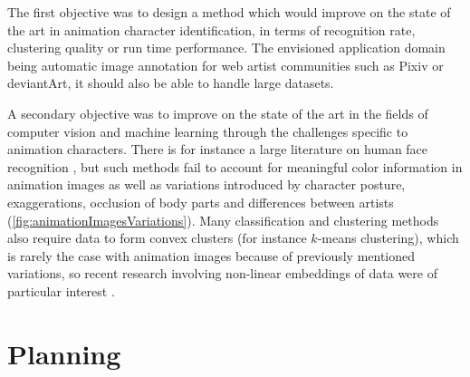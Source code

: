 The first objective was to design a method which would improve on the state of the art in animation character identification, in terms of recognition rate, clustering quality or run time performance. The envisioned application domain being automatic image annotation for web artist communities such as Pixiv\footnotemark[1]
 or deviantArt\footnotemark[2],
it should also be able to handle large datasets.

A secondary objective was to improve on the state of the art in the fields of computer vision and machine learning through the challenges specific to animation characters. There is for instance a large literature on human face recognition \cite{turk1991eigenfaces} \cite{belhumeur1997eigenfaces}, but such methods fail to account for meaningful color information in animation images as well as variations introduced by character posture, exaggerations, occlusion of body parts and differences between artists (\autoref{fig:animationImagesVariations}). Many classification and clustering methods also require data to form convex clusters (for instance $k$-means clustering), which is rarely the case with animation images because of previously mentioned variations, so recent research involving non-linear embeddings of data were of particular interest \cite{roweis2000nonlinear} \cite{belkin2003laplacian} .

\section{Planning}